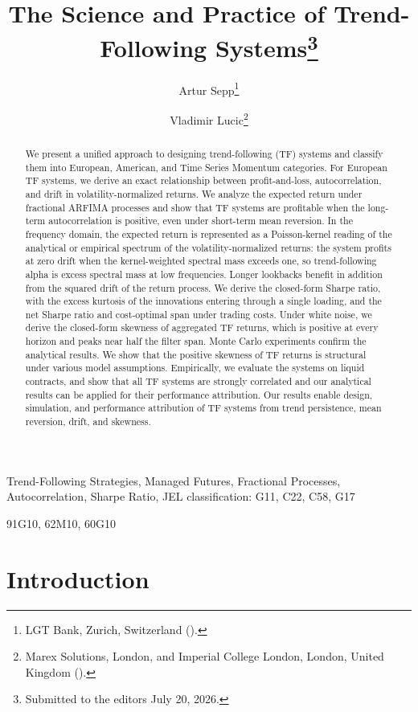 \documentclass[hidelinks]{siamonline250211}
\title{The Science and Practice of Trend-Following Systems\thanks{Submitted to the editors July 20, 2026.}}
\author{Artur Sepp\thanks{LGT Bank, Zurich, Switzerland (\email{artursepp@gmail.com}).}
\and Vladimir Lucic\thanks{Marex Solutions, London, and Imperial College London, London, United Kingdom (\email{v.lucic@imperial.ac.uk}).}}
\begin{document}
\maketitle

\begin{abstract}
	We present a unified approach to designing trend-following (TF) systems and classify them into European, American, and Time Series Momentum categories. For European TF systems, we derive an exact relationship between profit-and-loss, autocorrelation, and drift in volatility-normalized returns. We analyze the expected return under fractional ARFIMA processes and show that TF systems are profitable when the long-term autocorrelation is positive, even under short-term mean reversion. In the frequency domain, the expected return is represented as a Poisson-kernel reading of the analytical or empirical spectrum of the volatility-normalized returns: the system profits at zero drift when the kernel-weighted spectral mass exceeds one, so trend-following alpha is excess spectral mass at low frequencies. Longer lookbacks benefit in addition from the squared drift of the return process. We derive the closed-form Sharpe ratio, with the excess kurtosis of the innovations entering through a single loading, and the net Sharpe ratio and cost-optimal span under trading costs. Under white noise, we derive the closed-form skewness of aggregated TF returns, which is positive at every horizon and peaks near half the filter span. Monte Carlo experiments confirm the analytical results. We show that the positive skewness of TF returns is structural under various model assumptions. Empirically, we evaluate the systems on liquid contracts, and show that all TF systems are strongly correlated and our analytical results can be applied for their performance attribution.  Our results enable design, simulation, and performance attribution of TF systems from trend persistence, mean reversion, drift, and skewness.
\end{abstract}

\begin{keywords}
	Trend-Following Strategies, Managed Futures, Fractional Processes, Autocorrelation, Sharpe Ratio, JEL classification: G11, C22, C58, G17
\end{keywords}

\begin{MSCcodes}
	91G10, 62M10, 60G10
\end{MSCcodes}

\section{Introduction}
\end{document}
